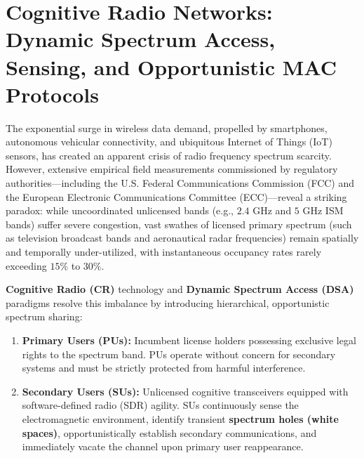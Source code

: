 \chapter{Cognitive Radio Networks: Dynamic Spectrum Access, Sensing, and Opportunistic MAC Protocols}
\label{sec:chapter6}

The exponential surge in wireless data demand, propelled by smartphones, autonomous vehicular connectivity, and ubiquitous Internet of Things (IoT) sensors, has created an apparent crisis of radio frequency spectrum scarcity. However, extensive empirical field measurements commissioned by regulatory authorities—including the U.S. Federal Communications Commission (FCC) and the European Electronic Communications Committee (ECC)—reveal a striking paradox: while uncoordinated unlicensed bands (e.g., $2.4\text{~GHz}$ and $5\text{~GHz}$ ISM bands) suffer severe congestion, vast swathes of licensed primary spectrum (such as television broadcast bands and aeronautical radar frequencies) remain spatially and temporally under-utilized, with instantaneous occupancy rates rarely exceeding $15\%$ to $30\%$.

\textbf{Cognitive Radio (CR)} technology and \textbf{Dynamic Spectrum Access (DSA)} paradigms resolve this imbalance by introducing hierarchical, opportunistic spectrum sharing:
\begin{enumerate}
    \item \textbf{Primary Users (PUs):} Incumbent license holders possessing exclusive legal rights to the spectrum band. PUs operate without concern for secondary systems and must be strictly protected from harmful interference.
    \item \textbf{Secondary Users (SUs):} Unlicensed cognitive transceivers equipped with software-defined radio (SDR) agility. SUs continuously sense the electromagnetic environment, identify transient \textbf{spectrum holes (white spaces)}, opportunistically establish secondary communications, and immediately vacate the channel upon primary user reappearance.
\end{enumerate}

